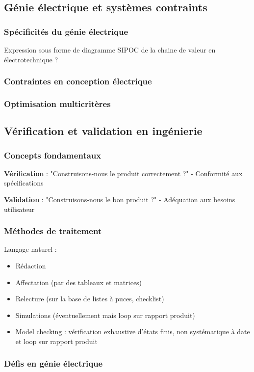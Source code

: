 \documentclass[a4paper,12pt]{article}
\begin{document}
\subsection{Génie électrique et systèmes contraints}
\label{sec:org1333e00}
\subsubsection{Spécificités du génie électrique}
\label{sec:org46e7538}
Expression sous forme de diagramme SIPOC de la chaine de valeur en électrotechnique ?
\subsubsection{Contraintes en conception électrique}
\label{sec:org9f22e3c}
\subsubsection{Optimisation multicritères}
\label{sec:orgdd45a23}
\subsection{Vérification et validation en ingénierie}
\label{sec:orgee41e7f}
\subsubsection{Concepts fondamentaux}
\label{sec:org3e3458d}
\textbf{Vérification} : "Construisons-nous le produit correctement ?" - Conformité aux spécifications

\textbf{Validation} : "Construisons-nous le bon produit ?" - Adéquation aux besoins utilisateur
\subsubsection{Méthodes de traitement}
\label{sec:org685305d}
Langage naturel :
\begin{itemize}
\item Rédaction
\item Affectation (par des tableaux et matrices)
\item Relecture (sur la base de listes à puces, checklist)
\item Simulations (éventuellement mais loop sur rapport produit)
\item Model checking : vérification exhaustive d'états finis, non systématique à date et loop sur rapport produit
\end{itemize}
\subsubsection{Défis en génie électrique}
\label{sec:org6c77b3b}
\end{document}
